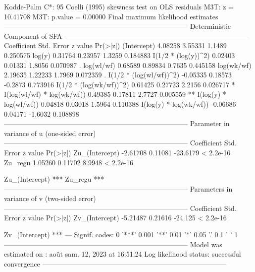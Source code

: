 \documentclass[nojss]{jss}
\begin{document}
\begin{Schunk}
\begin{Soutput}
Kodde-Palm C*:       95%: 5.13838                                   99%: 8.27327 
Coelli (1995) skewness test on OLS residuals
M3T: z                         =                                        10.41708 
M3T: p.value                   =                                         0.00000 
Final maximum likelihood estimates 
-------------------------------------------------------------------------------- 
                         Deterministic Component of SFA 
-------------------------------------------------------------------------------- 
                           Coefficient Std. Error z value Pr(>|z|)   
(Intercept)                    4.08258    3.55331  1.1489 0.250575   
log(y)                         0.31764    0.23957  1.3259 0.184883   
I(1/2 * (log(y))^2)            0.02403    0.01331  1.8056 0.070987 . 
log(wl/wf)                     0.68589    0.89834  0.7635 0.445158   
log(wk/wf)                     2.19635    1.22233  1.7969 0.072359 . 
I(1/2 * (log(wl/wf))^2)       -0.05335    0.18573 -0.2873 0.773916   
I(1/2 * (log(wk/wf))^2)        0.61425    0.27723  2.2156 0.026717 * 
I(log(wl/wf) * log(wk/wf))     0.49385    0.17811  2.7727 0.005559 **
I(log(y) * log(wl/wf))         0.04818    0.03018  1.5964 0.110388   
I(log(y) * log(wk/wf))        -0.06686    0.04171 -1.6032 0.108898   
-------------------------------------------------------------------------------- 
                  Parameter in variance of u (one-sided error) 
-------------------------------------------------------------------------------- 
                           Coefficient Std. Error  z value  Pr(>|z|)
Zu_(Intercept)                -2.61708    0.11081 -23.6179 < 2.2e-16
Zu_regu                        1.05260    0.11702   8.9948 < 2.2e-16
                              
Zu_(Intercept)             ***
Zu_regu                    ***
-------------------------------------------------------------------------------- 
                 Parameters in variance of v (two-sided error) 
-------------------------------------------------------------------------------- 
                           Coefficient Std. Error z value  Pr(>|z|)
Zv_(Intercept)                -5.21487    0.21616 -24.125 < 2.2e-16
                              
Zv_(Intercept)             ***
---
Signif. codes:  0 '***' 0.001 '**' 0.01 '*' 0.05 '.' 0.1 ' ' 1
-------------------------------------------------------------------------------- 
Model was estimated on : août sam. 12, 2023 at 16:51:24 
Log likelihood status: successful convergence  
-------------------------------------------------------------------------------- 
\end{Soutput}
\end{Schunk}
\end{document}
